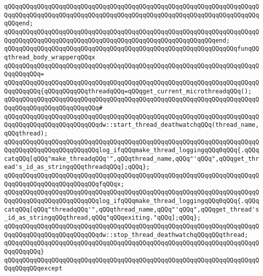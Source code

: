 \verb|qQQqqQQqqQQqqQQqqQQqqQQqqQQqqQQqqQQqqQQqqQQqqQQqqQQqqQQqqQQqqQQqqQQqqQQqqQQqqQQqqQQqqQQqqQQqqQQqqQQqqQQqqQQqqQQqqQQqqQQqqQQqqQQqqQQqqQQqqQQqqQQqend;|\newline
\verb|qQQqqQQqqQQqqQQqqQQqqQQqqQQqqQQqqQQqqQQqqQQqqQQqqQQqqQQqqQQqqQQqqQQqqQQqqQQqqQQqqQQqqQQqqQQqqQQqqQQqqQQqqQQqqQQqqQQqqQQqqQQqqQQqend;|\newline
\newline
\verb|qQQqqQQqqQQqqQQqqQQqqQQqqQQqqQQqqQQqqQQqqQQqqQQqqQQqqQQqqQQqqQQqfunqQQqthread_body_wrapperqQQqx|\newline
\verb|qQQqqQQqqQQqqQQqqQQqqQQqqQQqqQQqqQQqqQQqqQQqqQQqqQQqqQQqqQQqqQQqqQQqqQQqqQQqqQQq=|\newline
\verb|qQQqqQQqqQQqqQQqqQQqqQQqqQQqqQQqqQQqqQQqqQQqqQQqqQQqqQQqqQQqqQQqqQQqqQQqqQQqqQQq{qQQqqQQqqQQqthreadqQQq=qQQqget_current_microthreadqQQq();|\newline
\verb|qQQqqQQqqQQqqQQqqQQqqQQqqQQqqQQqqQQqqQQqqQQqqQQqqQQqqQQqqQQqqQQqqQQqqQQqqQQqqQQqqQQqqQQqqQQqqQQq#|\newline
\verb|qQQqqQQqqQQqqQQqqQQqqQQqqQQqqQQqqQQqqQQqqQQqqQQqqQQqqQQqqQQqqQQqqQQqqQQqqQQqqQQqqQQqqQQqqQQqqQQqdw::start_thread_deathwatchqQQq(thread_name,qQQqthread);|\newline
\newline
\verb|qQQqqQQqqQQqqQQqqQQqqQQqqQQqqQQqqQQqqQQqqQQqqQQqqQQqqQQqqQQqqQQqqQQqqQQqqQQqqQQqqQQqqQQqqQQqqQQqlog_ifqQQqmake_thread_loggingqQQq0qQQq{.qQQqcatqQQq[qQQq"make_threadqQQq'",qQQqthread_name,qQQq"'qQQq",qQQqget_thread's_id_as_stringqQQqthreadqQQq];qQQq};|\newline
\newline
\verb|qQQqqQQqqQQqqQQqqQQqqQQqqQQqqQQqqQQqqQQqqQQqqQQqqQQqqQQqqQQqqQQqqQQqqQQqqQQqqQQqqQQqqQQqqQQqqQQqfqQQqx;|\newline
\newline
\verb|qQQqqQQqqQQqqQQqqQQqqQQqqQQqqQQqqQQqqQQqqQQqqQQqqQQqqQQqqQQqqQQqqQQqqQQqqQQqqQQqqQQqqQQqqQQqqQQqlog_ifqQQqmake_thread_loggingqQQq0qQQq{.qQQqcatqQQq[qQQq"threadqQQq'",qQQqthread_name,qQQq"'qQQq",qQQqget_thread's_id_as_stringqQQqthread,qQQq"qQQqexiting."qQQq];qQQq};|\newline
\newline
\verb|qQQqqQQqqQQqqQQqqQQqqQQqqQQqqQQqqQQqqQQqqQQqqQQqqQQqqQQqqQQqqQQqqQQqqQQqqQQqqQQqqQQqqQQqqQQqqQQqdw::stop_thread_deathwatchqQQqqQQqthread;|\newline
\verb|qQQqqQQqqQQqqQQqqQQqqQQqqQQqqQQqqQQqqQQqqQQqqQQqqQQqqQQqqQQqqQQqqQQqqQQqqQQqqQQq}|\newline
\verb|qQQqqQQqqQQqqQQqqQQqqQQqqQQqqQQqqQQqqQQqqQQqqQQqqQQqqQQqqQQqqQQqqQQqqQQqqQQqqQQqexcept|\newline

